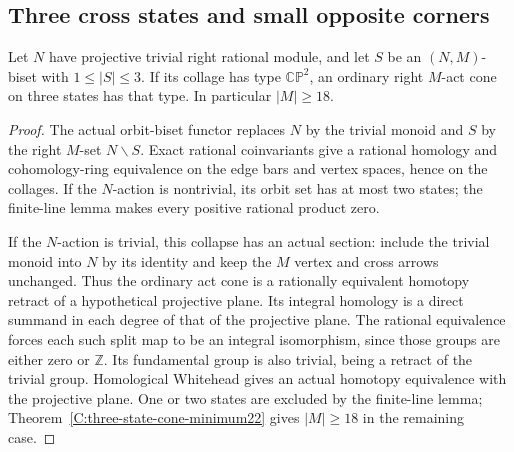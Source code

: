 \subsection{Three cross states and small opposite corners}

\begin{lemma}
\label{C:three-state-exact-coinvariants}
Let $N$ have projective trivial right rational module, and let
$S$ be an $(N,M)$-biset with $1\leq|S|\leq3$.
If its collage has type $\mathbb{CP}^2$, an ordinary right
$M$-act cone on three states has that type.
In particular $|M|\geq18$.
\end{lemma}
\begin{proof}
The actual orbit-biset functor replaces $N$ by the trivial
monoid and $S$ by the right $M$-set $N\backslash S$.
Exact rational coinvariants give a rational homology and
cohomology-ring equivalence on the edge bars and vertex spaces,
hence on the collages.  If the $N$-action is nontrivial, its
orbit set has at most two states; the finite-line lemma makes
every positive rational product zero.

If the $N$-action is trivial, this collapse has an actual
section: include the trivial monoid into $N$ by its identity
and keep the $M$ vertex and cross arrows unchanged.  Thus the
ordinary act cone is a rationally equivalent homotopy retract
of a hypothetical projective plane.  Its integral homology is
a direct summand in each degree of that of the projective plane.
The rational equivalence forces each such split map to be an
integral isomorphism, since those groups are either zero or
$\mathbb Z$.  Its fundamental group is also trivial, being a
retract of the trivial group.  Homological Whitehead gives an
actual homotopy equivalence with the projective plane.
One or two states are excluded by the finite-line lemma;
Theorem~\ref{C:three-state-cone-minimum22} gives $|M|\geq18$
in the remaining case.
\end{proof}

